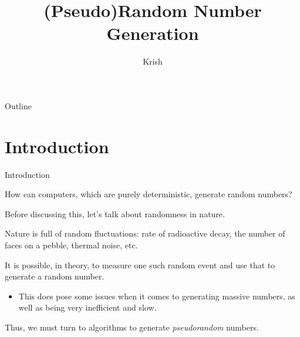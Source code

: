 \documentclass[aspectratio=169]{beamer}
\title{(Pseudo)Random Number Generation}
\author{Krish}
\date{}
\begin{document}

\begin{frame}
\titlepage
\end{frame}

\begin{frame}{Outline}
  \tableofcontents
\end{frame}


\section{Introduction}

\begin{frame}{Introduction}
  
  \begin{tcolorbox}[title=Problem,colbacktitle=sigma@mainblue]
    
  How can computers, which are purely deterministic, generate random numbers?
  \end{tcolorbox}

  Before discussing this, let's talk about randomness in nature. \pause
  
  Nature is full of random fluctuations: rate of radioactive decay, the number of faces on a pebble, thermal noise, etc. \pause

  It is possible, in theory, to measure one such random event and use that to generate a random number.
  \begin{itemize}
    \item This does pose some issues when it comes to generating massive numbers, as well as being very inefficient and slow.
  \end{itemize} \pause

  Thus, we must turn to algorithms to generate \textit{pseudorandom} numbers.

\end{frame}
\end{document}
